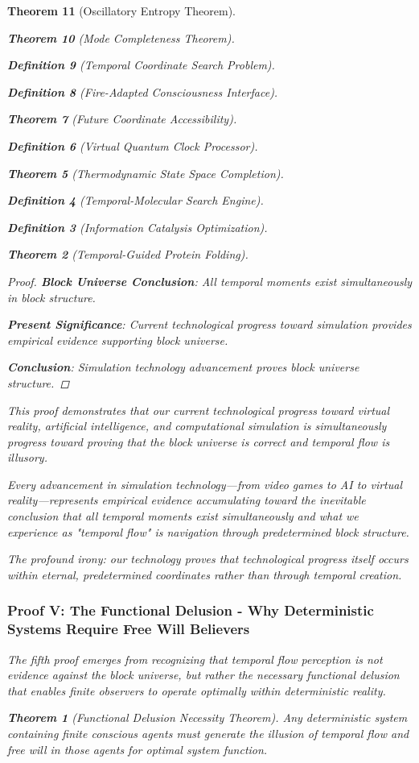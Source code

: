 \documentclass[12pt,a4paper]{article}
\newtheorem{theorem}{Theorem}[section]
\newtheorem{definition}[theorem]{Definition}
\begin{document}
\begin{theorem}[Oscillatory Entropy Theorem]
\begin{theorem}[Mode Completeness Theorem]
\begin{enumerate}
\begin{definition}[Temporal Coordinate Search Problem]
\begin{algorithm}
\begin{definition}[Fire-Adapted Consciousness Interface]
\begin{theorem}[Future Coordinate Accessibility]
\begin{definition}[Virtual Quantum Clock Processor]
\begin{itemize}
\begin{itemize}
\begin{theorem}[Thermodynamic State Space Completion]
\begin{definition}[Temporal-Molecular Search Engine]
\begin{definition}[Information Catalysis Optimization]
\begin{algorithm}
\begin{theorem}[Temporal-Guided Protein Folding]
\begin{table}[h]
\begin{proof}
\textbf{Block Universe Conclusion}: All temporal moments exist simultaneously in block structure.

\textbf{Present Significance}: Current technological progress toward simulation provides empirical evidence supporting block universe.

\textbf{Conclusion}: Simulation technology advancement proves block universe structure.
\end{proof}

\begin{remark}
This proof demonstrates that our current technological progress toward virtual reality, artificial intelligence, and computational simulation is simultaneously progress toward proving that the block universe is correct and temporal flow is illusory.

Every advancement in simulation technology—from video games to AI to virtual reality—represents empirical evidence accumulating toward the inevitable conclusion that all temporal moments exist simultaneously and what we experience as "temporal flow" is navigation through predetermined block structure.

The profound irony: our technology proves that technological progress itself occurs within eternal, predetermined coordinates rather than through temporal creation.
\end{remark}

\subsubsection{Proof V: The Functional Delusion - Why Deterministic Systems Require Free Will Believers}

The fifth proof emerges from recognizing that temporal flow perception is not evidence against the block universe, but rather the necessary functional delusion that enables finite observers to operate optimally within deterministic reality.

\begin{theorem}[Functional Delusion Necessity Theorem]
Any deterministic system containing finite conscious agents must generate the illusion of temporal flow and free will in those agents for optimal system function.
\end{theorem}


\end{table}
\end{theorem}
\end{algorithm}
\end{definition}
\end{definition}
\end{theorem}
\end{itemize}
\end{itemize}
\end{definition}
\end{theorem}
\end{definition}
\end{algorithm}
\end{definition}
\end{enumerate}
\end{theorem}
\end{theorem}
\end{document}
